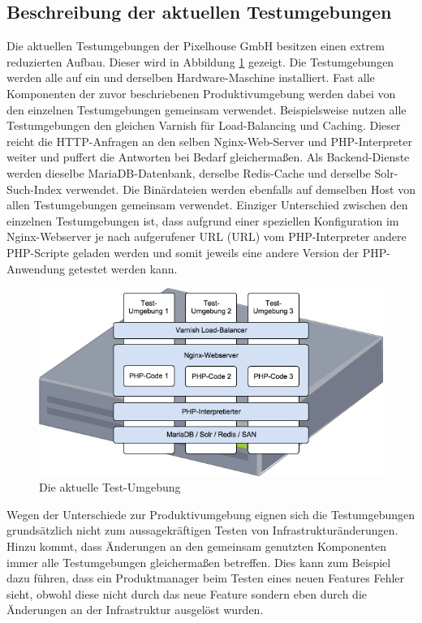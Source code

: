 \subsection{Beschreibung der aktuellen Testumgebungen}

Die aktuellen Testumgebungen der Pixelhouse GmbH besitzen einen extrem reduzierten Aufbau. Dieser wird in Abbildung \ref{alte-test} gezeigt. Die Testumgebungen werden alle auf ein und derselben Hardware-Maschine installiert. Fast alle Komponenten der zuvor beschriebenen Produktivumgebung werden dabei von den einzelnen Testumgebungen gemeinsam verwendet. Beispielsweise nutzen alle Testumgebungen den gleichen Varnish für Load-Balancing und Caching. Dieser reicht die HTTP-Anfragen an den selben Nginx-Web-Server und PHP-Interpreter weiter und puffert die Antworten bei Bedarf gleichermaßen. Als Backend-Dienste werden dieselbe MariaDB-Datenbank, derselbe Redis-Cache und derselbe Solr-Such-Index verwendet. Die Binärdateien werden ebenfalls auf demselben Host von allen Testumgebungen gemeinsam verwendet. Einziger Unterschied zwischen den einzelnen Testumgebungen ist, dass aufgrund einer speziellen Konfiguration im Nginx-Webserver je nach aufgerufener URL (\acl{URL}) vom PHP-Interpreter andere PHP-Scripte geladen werden und somit jeweils eine andere Version der PHP-Anwendung getestet werden kann.

\begin{figure}[!ht]
  \begin{center}
    \includegraphics[width=14cm]{bilder/Aktuelle-Testumgebung.png}
    \caption{Die aktuelle Test-Umgebung}
    \label{alte-test}
  \end{center}
\end{figure}

Wegen der Unterschiede zur Produktivumgebung eignen sich die Testumgebungen grundsätzlich nicht zum aussagekräftigen Testen von Infrastrukturänderungen. Hinzu kommt, dass Änderungen an den gemeinsam genutzten Komponenten immer alle Testumgebungen gleichermaßen betreffen. Dies kann zum Beispiel dazu führen, dass ein Produktmanager beim Testen eines neuen Features Fehler sieht, obwohl diese nicht durch das neue Feature sondern eben durch die Änderungen an der Infrastruktur ausgelöst wurden.


